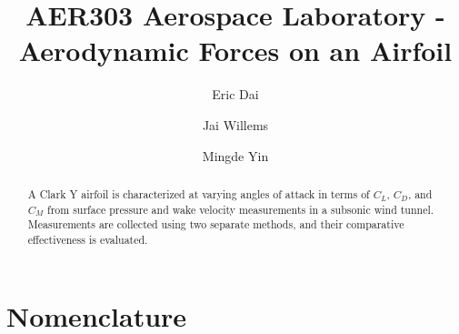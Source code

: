 \documentclass[runningheads]{llncs}
\begin{document}
\title{AER303 Aerospace Laboratory - Aerodynamic Forces on an Airfoil}

\author{Eric Dai \and Jai Willems \and Mingde Yin}


\maketitle




\begin{abstract}

A Clark Y airfoil is characterized at varying angles of attack in terms of $C_L$, $C_D$, and $C_M$ from surface pressure and wake velocity measurements in a subsonic wind tunnel. Measurements are collected using two separate methods, and their comparative effectiveness is evaluated.

\end{abstract}




\section*{Nomenclature}


\end{document}
